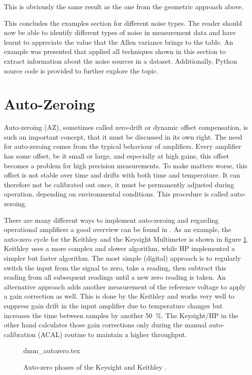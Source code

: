 This is obviously the same result as the one from the geometric approach above.

This concludes the examples section for different noise types. The reader should now be able to identify different types of noise in measurement data and have learnt to appreciate the value that the Allen variance brings to the table. An example was presented that applied all techniques shown in this section to extract information about the noise sources in a dataset. Additionally, Python source code is provided to further explore the topic.

\clearpage
\section{Auto-Zeroing}%
\label{sec:autozero}
Auto-zeroing (AZ), sometimes called zero-drift or dynamic offset compensation, is such an important concept, that it must be discussed in its own right. The need for auto-zeroing comes from the typical behaviour of amplifiers. Every amplifier has some offset, be it small or large, and especially at high gains, this offset becomes a problem for high precision measurements. To make matters worse, this offset is not stable over time and drifts with both time and temperature. It can therefore not be calibrated out once, it must be permanently adjusted during operation, depending on environmental conditions. This procedure is called auto-zeroing.

There are many different ways to implement auto-zeroing and regarding operational amplifiers a good overview can be found in \cite{horowitz1989}. As an example, the auto-zero cycle for the Keithley  and the Keysight  Multimeter is shown in figure \ref{fig:dmm_autozero_comparison}. Keithley uses a more complex and slower algorithm, while HP implemented a simpler but faster algorithm. The most simple (digital) approach is to regularly switch the input from the signal to zero, take a reading, then subtract this reading from all subsequent readings until a new zero reading is taken. An alternative approach adds another measurement of the reference voltage to apply a gain correction as well. This is done by the Keithley  and works very well to suppress gain drift in the input amplifier due to temperature changes but increases the time between samples by another \qty{50}{\percent}. The Keysight/HP  in the other hand calculates those gain corrections only during the manual auto-calibration (ACAL) routine to maintain a higher throughput.
\begin{figure}[hb]
    \centering
        {dmm_autozero.tex}
    \caption{Auto-zero phases of the Keysight  and Keithley .}
    \label{fig:dmm_autozero_comparison}
\end{figure}

